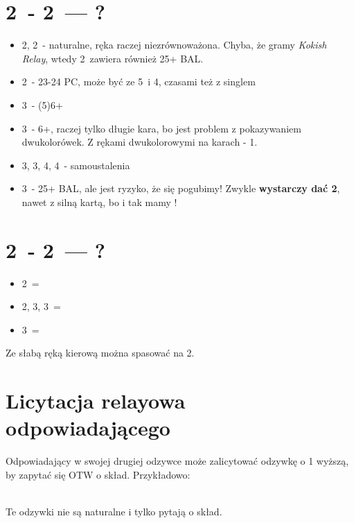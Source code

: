 \documentclass[12pt, a4paper]{article}
\begin{document}
\pagebreak
\section{2\clubs\ - 2\diams\ --- ?}
\begin{itemize}
    \item 2\hearts, 2\spades\ - naturalne, ręka raczej niezrównoważona. Chyba, że gramy
    \emph{Kokish Relay}, wtedy 2\hearts\ zawiera również 25+ BAL.
    \item 2\nt\ - 23-24 PC, może być ze 5\major\ i 4\minor, czasami też z singlem
    \item 3\clubs\ - (5)6+\clubs
    \item 3\diams\ - 6+\diams, raczej tylko długie kara, bo jest problem z pokazywaniem dwukolorówek. 
    Z rękami dwukolorowymi na karach - 1\diams.
    \item 3\hearts, 3\spades, 4\clubs, 4\diams\ - samoustalenia
    \item 3\nt\ - 25+ BAL, ale jest ryzyko, że się pogubimy! Zwykle \textbf{wystarczy dać 2\ntx}, 
    nawet z silną kartą, bo i tak mamy \gf!
\end{itemize}

\section{2\clubs\ - 2\hearts\ --- ?}
\begin{itemize}
    \item 2\spades\ = \fonce
    \item 2\nt, 3\clubs, 3\diams\ = \nf
    \item 3\hearts\ = \gf
\end{itemize}
Ze słabą ręką kierową można spasować na 2\hearts.

\section{Licytacja relayowa odpowiadającego}
\raggedright
Odpowiadający w swojej drugiej odzywce może zalicytować odzywkę o 1 wyższą, by zapytać się OTW o skład.
Przykładowo: \\[1em]
\webidding{
    2\clubs & 2\diams \\
    2\hearts & \conventional{2\spades}
}
\webidding{
    2\clubs & 2\diams \\
    2\spades & \conventional{2\ntx}
} \\[1em]
\raggedright
Te odzywki nie są naturalne i tylko pytają o skład.
\end{document}

